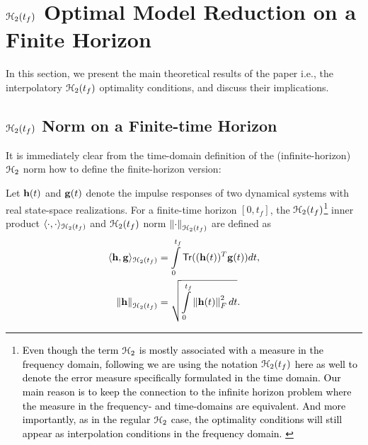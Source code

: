 \documentclass[twocolumn]{autart}
\begin{document}
\section{$\EuScript{H}_2(t_f)$ Optimal Model Reduction on a Finite Horizon}  \label{sec:main} 
%
{\color{black}
In this section, we present  the main theoretical results of the paper i.e., the interpolatory $\EuScript{H}_2(t_f)$  optimality conditions, and discuss their implications.}



  
\subsection{$\EuScript{H}_2(t_f)$ Norm on a Finite-time Horizon}
It is immediately clear from the time-domain definition of the (infinite-horizon) $\EuScript{H}_2$ norm how to define the finite-horizon version:
\begin{Definition}\label{innerh2}
Let $\mathbf{h}(t)$ and $\mathbf{g}(t)$ denote the impulse responses of two dynamical systems with real state-space realizations.  
For a finite-time horizon 
$[0,t_f]$, the $\EuScript{H}_2(t_f)$\footnote{\textcolor{black}{Even though the term  $\EuScript{H}_2$ is mostly associated with a measure in the frequency domain, following \cite{RedK17,GoyR17} we are using the notation $\EuScript{H}_2(t_f)$ here as well to denote the error measure specifically formulated in the time domain. Our main reason is to keep the connection to the infinite horizon problem where the measure in the frequency- and time-domains are equivalent. And more importantly, as in the regular $\EuScript{H}_2$ case, the optimality conditions will still appear as interpolation conditions in the frequency domain. 
 }}
   inner product $\langle \cdot, \cdot \rangle_{\EuScript{H}_2(t_f)}$ 
and $\EuScript{H}_2(t_f)$ norm $\left\lVert\cdot\right\rVert_{\EuScript{H}_2(t_f)}$ are defined as  
\begin{align*}
\langle \h, \g \rangle_{\ch_2(\tf)} &=\int_0^{\tf} \mathsf{Tr}( (\h(t))^T \g(t)) dt, \\%
\norm{\h}_{\ch_2(\tf)} &=\sqrt{\int_0^{\tf} \norm{\h(t)}_F^2 dt}.
\end{align*}

\end{Definition}
\end{document}
